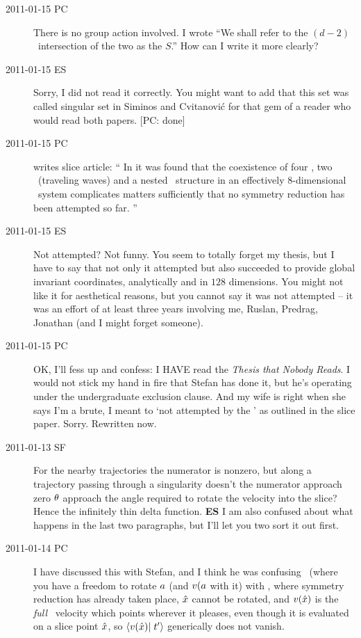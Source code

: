 \begin{description}
\item[2011-01-15 PC] There is no group action involved. I wrote
``We shall refer to the $(d\!-\!2)$\dmn\ intersection of the two as the
{\em \sset} $S$.'' How can I write it more clearly?

\item[2011-01-15 ES] Sorry, I did not read it correctly. You might want to
add that this set was called singular set in
Siminos and Cvitanovi\'c for that gem of a reader who would
read both papers. [PC: done]

\item[2011-01-15 PC] writes slice article: ``
In  it
was found that the coexistence of four \eqva, two \reqva\
(traveling waves) and a
nested \fixedsp\ structure in an effectively $8$-dimensional \KS\ system
complicates matters sufficiently that no symmetry reduction has been
attempted so far.
''

\item[2011-01-15 ES]  Not attempted? Not funny. You seem to
totally forget my thesis, but I have to say that not only it attempted
but also succeeded to provide global invariant coordinates, analytically
and in $128$ dimensions. You might not like it for aesthetical reasons,
but you cannot say it was not attempted -- it was an effort of
at least three years involving me, Ruslan, Predrag, Jonathan (and I might
forget someone).

\item[2011-01-15 PC]
OK, I'll fess up and confess: I HAVE read the
\emph{
           {Thesis that Nobody Reads}}.
I would not stick my hand in fire that Stefan has done it, but he's
operating under the undergraduate exclusion clause. And my wife is right
when she says I'm a brute, I meant to `not attempted by the \mslices' as
outlined in the slice paper. Sorry. Rewritten now.

\item[2011-01-13 SF]
For the nearby trajectories the numerator is nonzero, but along a
trajectory passing through a singularity doesn't the numerator approach
zero ${\bf \theta}$ approach the angle required to rotate the velocity into
the slice? Hence the infinitely thin delta function. {\bf ES} I am also
confused about what happens in the last two paragraphs, but I'll let you
two sort it out first.

\item[2011-01-14 PC] I have discussed this with Stefan, and I think he
was confusing \mframes\ (where you have a freedom to rotate $a$ (and
$v(a$ with it) with \mslices, where symmetry reduction has already
taken place, $\hat{x}$ cannot be rotated, and $v(\hat{x})$ is the
\emph{full} \statesp\ velocity which points wherever it pleases, even
though it is evaluated on a slice point $\hat{x}$, so
${\braket{\vel(\sspRed)}{\sliceTan{}}}$ generically does not vanish.



\end{description}
